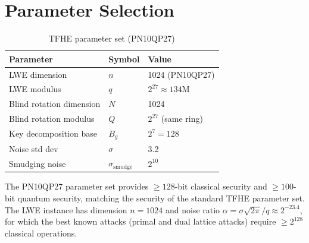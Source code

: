\section{Parameter Selection}

\label{sec:params}

\begin{table}[h]
\centering
\begin{tabular}{@{}lll@{}}
\toprule
\textbf{Parameter} & \textbf{Symbol} & \textbf{Value} \\
\midrule
LWE dimension & $n$ & 1024 (PN10QP27) \\
LWE modulus & $q$ & $2^{27} \approx 134\text{M}$ \\
Blind rotation dimension & $N$ & 1024 \\
Blind rotation modulus & $Q$ & $2^{27}$ (same ring) \\
Key decomposition base & $B_g$ & $2^7 = 128$ \\
Noise std dev & $\sigma$ & 3.2 \\
Smudging noise & $\sigma_{\text{smudge}}$ & $2^{10}$ \\
\bottomrule
\end{tabular}
\caption{TFHE parameter set (PN10QP27)}
\label{tab:tfhe-params}
\end{table}

\begin{proposition}
\label{prop:security}
The PN10QP27 parameter set provides $\geq 128$-bit classical security and $\geq 100$-bit
quantum security, matching the security of the standard TFHE parameter set.
The LWE instance has dimension $n = 1024$ and noise ratio $\alpha = \sigma\sqrt{2\pi}/q \approx 2^{-23.4}$,
for which the best known attacks (primal and dual lattice attacks) require $\geq 2^{128}$
classical operations.
\end{proposition}

